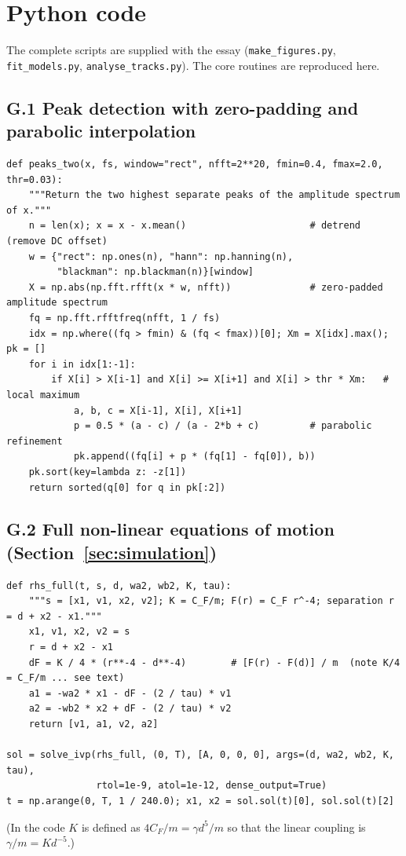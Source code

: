 
\section{Python code}\label{app:code}

The complete scripts are supplied with the essay (\texttt{make\_figures.py}, \texttt{fit\_models.py}, \texttt{analyse\_tracks.py}). The core routines are reproduced here.

\subsection*{G.1 Peak detection with zero-padding and parabolic interpolation}
\begin{lstlisting}
def peaks_two(x, fs, window="rect", nfft=2**20, fmin=0.4, fmax=2.0, thr=0.03):
    """Return the two highest separate peaks of the amplitude spectrum of x."""
    n = len(x); x = x - x.mean()                      # detrend (remove DC offset)
    w = {"rect": np.ones(n), "hann": np.hanning(n),
         "blackman": np.blackman(n)}[window]
    X = np.abs(np.fft.rfft(x * w, nfft))              # zero-padded amplitude spectrum
    fq = np.fft.rfftfreq(nfft, 1 / fs)
    idx = np.where((fq > fmin) & (fq < fmax))[0]; Xm = X[idx].max(); pk = []
    for i in idx[1:-1]:
        if X[i] > X[i-1] and X[i] >= X[i+1] and X[i] > thr * Xm:   # local maximum
            a, b, c = X[i-1], X[i], X[i+1]
            p = 0.5 * (a - c) / (a - 2*b + c)         # parabolic refinement
            pk.append((fq[i] + p * (fq[1] - fq[0]), b))
    pk.sort(key=lambda z: -z[1])
    return sorted(q[0] for q in pk[:2])
\end{lstlisting}

\subsection*{G.2 Full non-linear equations of motion (Section~\ref{sec:simulation})}
\begin{lstlisting}
def rhs_full(t, s, d, wa2, wb2, K, tau):
    """s = [x1, v1, x2, v2]; K = C_F/m; F(r) = C_F r^-4; separation r = d + x2 - x1."""
    x1, v1, x2, v2 = s
    r = d + x2 - x1
    dF = K / 4 * (r**-4 - d**-4)        # [F(r) - F(d)] / m  (note K/4 = C_F/m ... see text)
    a1 = -wa2 * x1 - dF - (2 / tau) * v1
    a2 = -wb2 * x2 + dF - (2 / tau) * v2
    return [v1, a1, v2, a2]

sol = solve_ivp(rhs_full, (0, T), [A, 0, 0, 0], args=(d, wa2, wb2, K, tau),
                rtol=1e-9, atol=1e-12, dense_output=True)
t = np.arange(0, T, 1 / 240.0); x1, x2 = sol.sol(t)[0], sol.sol(t)[2]
\end{lstlisting}
(In the code $K$ is defined as $4C_F/m=\gamma d^5/m$ so that the linear coupling is $\gamma/m=K d^{-5}$.)

